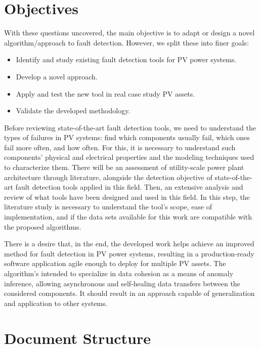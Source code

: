\section{Objectives}

With these questions uncovered, the main objective is to adapt or design a novel algorithm/approach to fault detection. However, we split these into finer goals:

\begin{itemize}
    \item  Identify and study existing fault detection tools for PV
    power systems.
    \item  Develop a novel approach.
    \item Apply and test the new tool in real case study PV assets.
    \item Validate the developed methodology.
\end{itemize}

Before reviewing state-of-the-art fault detection tools, we need to understand the types of failures in PV systems: find which components usually fail, which ones fail more often, and how often. For this, it is necessary to understand such components' physical and electrical properties and the modeling techniques used to characterize them. There will be an assessment of utility-scale power plant architecture through literature, alongside the detection objective of state-of-the-art fault detection tools applied in this field. Then, an extensive analysis and review of what tools have been designed and used in this field. In this step, the literature study is necessary to understand the tool's scope, ease of implementation, and if the data sets available for this work are compatible with the proposed algorithms.

There is a desire that, in the end, the developed work helps achieve an improved method for fault detection in PV power systems, resulting in a production-ready software application agile enough to deploy for multiple PV assets. The algorithm's intended to specialize in data cohesion as a means of anomaly inference, allowing asynchronous and self-healing data transfers between the considered components. It should result in an approach capable of generalization and application to other systems.

\section{Document Structure}

